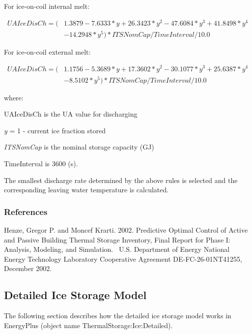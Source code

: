 For ice-on-coil internal melt:

\begin{equation}
\begin{split}
{UAIceDisCh} = (& 1.3879 - 7.6333*{y} + 26.3423*{y^2} - 47.6084*{y^3} + 41.8498*{y^4} \\
&- 14.2948*{y^5} ) * {ITSNomCap} / {TimeInterval} / 10.0
\end{split}
\end{equation}

For ice-on-coil external melt:

\begin{equation}
\begin{split}
{UAIceDisCh} = (& 1.1756 - 5.3689*{y} + 17.3602*{y^2} - 30.1077*{y^3} + 25.6387*{y^4} \\
&- 8.5102*{y^5} ) * {ITSNomCap} / {TimeInterval} / 10.0
\end{split}
\end{equation}

where:

UAIceDisCh is the UA value for discharging

\emph{y} = 1 - current ice fraction stored

\emph{ITSNomCap} is the nominal storage capacity (GJ)

TimeInterval is 3600 (s).

The smallest discharge rate determined by the above rules is selected and the corresponding leaving water temperature is calculated.

\subsubsection{References}\label{references-028}

Henze, Gregor P. and Moncef Krarti. 2002. Predictive Optimal Control of Active and Passive Building Thermal Storage Inventory, Final Report for Phase I:~ Analysis, Modeling, and Simulation.~ U.S. Department of Energy National Energy Technology Laboratory Cooperative Agreement DE-FC-26-01NT41255, December 2002.

\subsection{Detailed Ice Storage Model}\label{detailed-ice-storage-model}

The following section describes how the detailed ice storage model works in EnergyPlus (object name ThermalStorage:Ice:Detailed).

